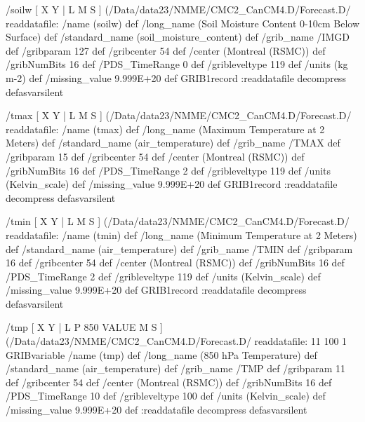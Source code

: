 \begin{ingrid}
/soilw {
[ X Y | L M S ] (/Data/data23/NMME/CMC2_CanCM4.D/Forecast.D/%
readdatafile: 
/name (soilw) def
/long_name (Soil Moisture Content 0-10cm Below Surface) def
/standard_name (soil_moisture_content) def
/grib_name /IMGD def
/gribparam 127 def
/gribcenter 54 def
/center (Montreal (RSMC)) def
/gribNumBits 16 def
/PDS_TimeRange 0 def
/gribleveltype 119 def
/units (kg m-2) def
/missing_value 9.999E+20 def
GRIB1record
:readdatafile decompress
} defasvarsilent

/tmax {
[ X Y | L M S ] (/Data/data23/NMME/CMC2_CanCM4.D/Forecast.D/%
readdatafile: 
/name (tmax) def
/long_name (Maximum Temperature at 2 Meters) def
/standard_name (air_temperature) def
/grib_name /TMAX def
/gribparam 15 def
/gribcenter 54 def
/center (Montreal (RSMC)) def
/gribNumBits 16 def
/PDS_TimeRange 2 def
/gribleveltype 119 def
/units (Kelvin_scale) def
/missing_value 9.999E+20 def
GRIB1record
:readdatafile decompress
} defasvarsilent

/tmin {
[ X Y | L M S ] (/Data/data23/NMME/CMC2_CanCM4.D/Forecast.D/%
readdatafile: 
/name (tmin) def
/long_name (Minimum Temperature at 2 Meters) def
/standard_name (air_temperature) def
/grib_name /TMIN def
/gribparam 16 def
/gribcenter 54 def
/center (Montreal (RSMC)) def
/gribNumBits 16 def
/PDS_TimeRange 2 def
/gribleveltype 119 def
/units (Kelvin_scale) def
/missing_value 9.999E+20 def
GRIB1record
:readdatafile decompress
} defasvarsilent

/tmp {
[ X Y | L P 850 VALUE M S ] (/Data/data23/NMME/CMC2_CanCM4.D/Forecast.D/%
readdatafile: 
11 100 1 GRIBvariable
/name (tmp) def
/long_name (850 hPa Temperature) def
/standard_name (air_temperature) def
/grib_name /TMP def
/gribparam 11 def
/gribcenter 54 def
/center (Montreal (RSMC)) def
/gribNumBits 16 def
/PDS_TimeRange 10 def
/gribleveltype 100 def
/units (Kelvin_scale) def
/missing_value 9.999E+20 def
:readdatafile decompress
} defasvarsilent


\end{ingrid}
